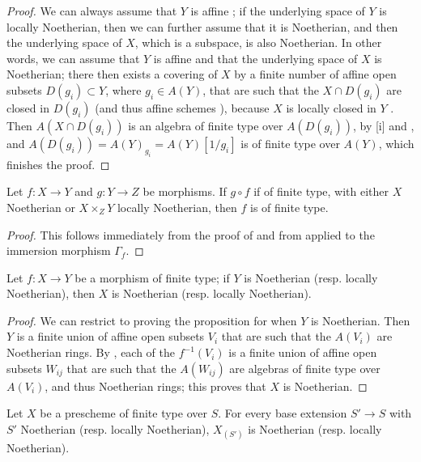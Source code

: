 \begin{proof}
\label{proof-1.6.3.5}
We can always assume that $Y$ is affine ;
if the underlying space of $Y$ is locally Noetherian, then we can further assume that it is Noetherian, and then the underlying space of $X$, which is a subspace, is also Noetherian.
In other words, we can assume that $Y$ is affine and that the underlying space of $X$ is Noetherian;
there then exists a covering of $X$ by a finite number of affine open subsets $D(g_i)\subset Y$, where $g_i\in A(Y)$, that are such that the $X\cap D(g_i)$ are closed in $D(g_i)$ (and thus affine schemes ), because $X$ is locally closed in $Y$ .
Then $A(X\cap D(g_i))$ is an algebra of finite type over $A(D(g_i))$, by [i] and , and $A(D(g_i))=A(Y)_{g_i}=A(Y)[1/g_i]$ is of finite type over $A(Y)$, which finishes the proof.
\end{proof}

\begin{corollary}[6.3.6]
\label{I.6.3.6}
Let $f:X\to Y$ and $g:Y\to Z$ be morphisms.
If $g\circ f$ if of finite type, with either $X$ Noetherian or $X\times_Z Y$ locally Noetherian, then $f$ is of finite type.
\end{corollary}

\begin{proof}
\label{proof-1.6.3.6}
This follows immediately from the proof of  and from  applied to the immersion morphism $\Gamma_f$.
\end{proof}

\begin{proposition}[6.3.7]
\label{I.6.3.7}
Let $f:X\to Y$ be a morphism of finite type;
if $Y$ is Noetherian (resp. locally Noetherian), then $X$ is Noetherian (resp. locally Noetherian).
\end{proposition}

\begin{proof}
\label{proof-1.6.3.7}
We can restrict to proving the proposition for when $Y$ is Noetherian.
Then $Y$ is a finite union of affine open subsets $V_i$ that are such that the $A(V_i)$ are Noetherian rings.
By , each of the $f^{-1}(V_i)$ is a finite union of affine open subsets $W_{ij}$ that are such that the $A(W_{ij})$ are algebras of finite type over $A(V_i)$, and thus Noetherian rings;
this proves that $X$ is Noetherian.
\end{proof}

\begin{corollary}[6.3.8]
\label{I.6.3.8}
Let $X$ be a prescheme of finite type over $S$.
For every base extension $S'\to S$ with $S'$ Noetherian (resp. locally Noetherian), $X_{(S')}$ is Noetherian (resp. locally Noetherian).
\end{corollary}

